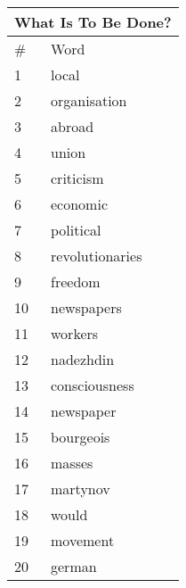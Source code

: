 \documentclass{pnastwo}
\begin{document}
\begin{article}
\begin{center}
  \begin{tabular}{ | l | l | }
    \hline
\multicolumn{2}{|c|}{What Is To Be Done?} \\ \hline
\# & Word  \\ \hline
1 & local \\ \hline
2 & organisation \\ \hline
3 & abroad \\ \hline
4 & union \\ \hline
5 & criticism \\ \hline
6 & economic \\ \hline
7 & political \\ \hline
8 & revolutionaries \\ \hline
9 & freedom \\ \hline
10 & newspapers \\ \hline
11 & workers \\ \hline
12 & nadezhdin \\ \hline
13 & consciousness \\ \hline
14 & newspaper \\ \hline
15 & bourgeois \\ \hline
16 & masses \\ \hline
17 & martynov \\ \hline
18 & would \\ \hline
19 & movement \\ \hline
20 & german \\ \hline
  \end{tabular}
\end{center}


\end{article}
\end{document}
